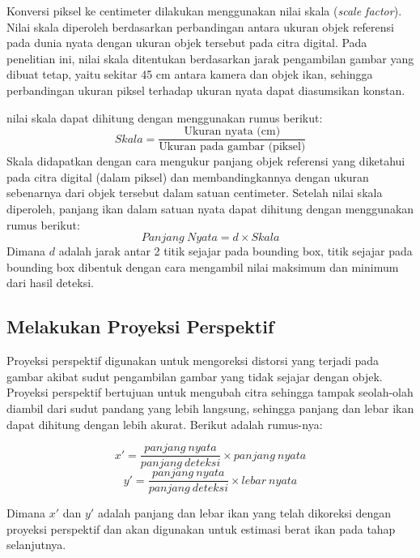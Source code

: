 Konversi piksel ke centimeter dilakukan menggunakan nilai skala (\emph{scale factor}). 
Nilai skala diperoleh berdasarkan perbandingan antara ukuran objek referensi pada dunia nyata dengan ukuran objek tersebut pada citra digital. 
Pada penelitian ini, nilai skala ditentukan berdasarkan jarak pengambilan gambar yang dibuat tetap, yaitu sekitar 45 cm antara kamera dan objek ikan, sehingga perbandingan ukuran piksel terhadap ukuran nyata dapat diasumsikan konstan.

nilai skala dapat dihitung dengan menggunakan rumus berikut:
\begin{equation*}
    Skala = \frac{\text{Ukuran nyata (cm)}}{\text{Ukuran pada gambar (piksel)}}
\end{equation*}
Skala didapatkan dengan cara mengukur panjang objek referensi yang diketahui pada citra digital (dalam piksel) dan membandingkannya dengan ukuran sebenarnya dari objek tersebut dalam satuan centimeter.
Setelah nilai skala diperoleh, panjang ikan dalam satuan nyata dapat dihitung dengan menggunakan rumus berikut:
\begin{equation}
    Panjang\ Nyata = d \times Skala
\end{equation}
    Dimana \(d\) adalah jarak antar 2 titik sejajar pada bounding box, titik sejajar pada bounding box dibentuk dengan cara mengambil nilai maksimum dan minimum dari hasil deteksi.

\subsection{Melakukan Proyeksi Perspektif}
    Proyeksi perspektif digunakan untuk mengoreksi distorsi yang terjadi pada gambar akibat sudut pengambilan gambar yang tidak sejajar dengan objek. Proyeksi perspektif bertujuan untuk mengubah citra sehingga tampak seolah-olah diambil dari sudut pandang yang lebih langsung, sehingga panjang dan lebar ikan dapat dihitung dengan lebih akurat. Berikut adalah rumus-nya:

    \begin{equation*}
        x' = \frac{panjang\ nyata}{panjang\ deteksi} \times panjang\ nyata
    \end{equation*}
    \begin{equation*}
        y' = \frac{panjang\ nyata}{panjang\ deteksi} \times lebar\ nyata
    \end{equation*}

    Dimana \(x'\) dan \(y'\) adalah panjang dan lebar ikan yang telah dikoreksi dengan proyeksi perspektif dan akan digunakan untuk estimasi berat ikan pada tahap selanjutnya. 

